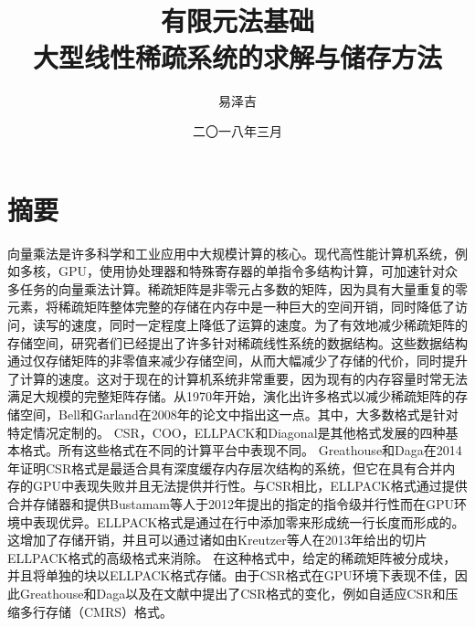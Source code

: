 \documentclass[forprint]{WHUBachelor}
\begin{document}



\title{\\有限元法基础\\大型线性稀疏系统的求解与储存方法}

\author{易泽吉}                            %



\date{二〇一八年三月}                    %


\maketitle
\frontmatter
{}              %


\mainmatter %
\tableofcontents
\chapter{摘要}
向量乘法是许多科学和工业应用中大规模计算的核心。现代高性能计算机系统，例如多核，GPU，使用协处理器和特殊寄存器的单指令多结构计算，可加速针对众多任务的向量乘法计算。稀疏矩阵是非零元占多数的矩阵，因为具有大量重复的零元素，将稀疏矩阵整体完整的存储在内存中是一种巨大的空间开销，同时降低了访问，读写的速度，同时一定程度上降低了运算的速度。为了有效地减少稀疏矩阵的存储空间，研究者们已经提出了许多针对稀疏线性系统的数据结构。这些数据结构通过仅存储矩阵的非零值来减少存储空间，从而大幅减少了存储的代价，同时提升了计算的速度。这对于现在的计算机系统非常重要，因为现有的内存容量时常无法满足大规模的完整矩阵存储。从1970年开始，演化出许多格式以减少稀疏矩阵的存储空间，Bell和Garland在2008年的论文中指出这一点\cite{Bell:SpMV:NVIDIA:2008}。其中，大多数格式是针对特定情况定制的。 CSR，COO，ELLPACK和Diagonal是其他格式发展的四种基本格式。所有这些格式在不同的计算平台中表现不同。 Greathouse和Daga在2014年证明CSR格式\cite{GreathouseCSR}是最适合具有深度缓存内存层次结构的系统，但它在具有合并内存的GPU中表现失败并且无法提供并行性。与CSR相比，ELLPACK格式通过提供合并存储器和提供Bustamam等人于2012年提出的指定的指令级并行性而在GPU环境中表现优异\cite{Bustamam2013Implementation}。ELLPACK格式是通过在行中添加零来形成统一行长度而形成的。 这增加了存储开销，并且可以通过诸如由Kreutzer等人在2013年给出的切片ELLPACK格式的高级格式来消除。 在这种格式中，给定的稀疏矩阵被分成块，并且将单独的块以ELLPACK格式存储。由于CSR格式在GPU环境下表现不佳，因此Greathouse和Daga\cite{GreathouseCSR}以及\cite{Szkoda2014Multi}在文献中提出了CSR格式的变化，例如自适应CSR和压缩多行存储（CMRS）格式。 
\end{document}
